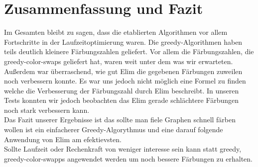 \documentclass[11pt]{article}
\begin{document}
\section{Zusammenfassung und Fazit} %

Im Gesamten bleibt zu sagen, dass die etablierten Algorithmen vor allem Fortschritte in der Laufzeitoptimierung waren.
Die greedy-Algorithmen haben teils deutlich kleinere Färbungszahlen geliefert. Vor allem die Färbungszahlen, die greedy-color-swaps geliefert hat, waren weit unter dem was wir erwarteten. \\
Außerdem war überraschend, wie gut Elim die gegebenen Färbungen zuweilen noch verbessern konnte. Es war uns jedoch nicht möglich eine Formel zu finden welche die Verbesserung der Färbungszahl durch Elim beschreibt. In unseren Tests konnten wir jedoch beobachten das Elim gerade schlächtere Färbungen noch stark verbessern kann. \\

Das Fazit unserer Ergebnisse ist das sollte man fiele Graphen schnell färben wollen ist ein einfacherer Greedy-Algorythmus und eine darauf folgende Anwendung von Elim am efektievsten. \\
Sollte Laufzeit oder Rechenkraft von weniger interesse sein kann statt greedy, greedy-color-swapps angewendet werden um noch bessere Färbungen zu erhalten.



\end{document}
